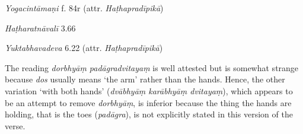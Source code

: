 \begin{ekdosis}
\begin{sources}[hp01_028]
\end{sources}

\begin{testimonia}[hp01_028]
\emph{Yogacintāmaṇi} f. 84r (attr. \emph{Haṭhapradīpikā})

\begin{versinnote}
\end{versinnote}

\emph{Haṭharatnāvalī} 3.66

\begin{versinnote}
\tl{\var{dorbhyāṃ padāgradvitayaṃ ] dvābhyāṃ karābhyāṃ dvitayaṃ n1,n3}\\!}
\end{versinnote}

\emph{Yuktabhavadeva} 6.22 (attr. \emph{Haṭhapradīpikā})

\begin{versinnote}
\end{versinnote}

\end{testimonia}

\begin{philcomm}[hp01_028]
The reading \emph{dorbhyāṃ padāgradvitayaṃ} is well attested but is somewhat strange because \emph{dos} usually means `the arm' rather than the hands. Hence, the other variation `with both hands' (\emph{dvābhyāṃ karābhyāṃ dvitayaṃ}), which appears to be an attempt to remove \emph{dorbhyāṃ}, is inferior because the thing the hands are holding, that is the toes (\emph{padāgra}), is not explicitly stated in this version of the verse.
\end{philcomm}


\end{ekdosis}

